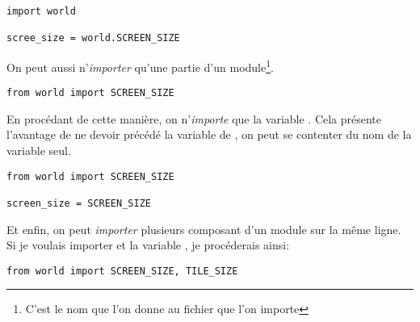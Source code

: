 \begin{lstlisting}
import world

scree_size = world.SCREEN_SIZE
\end{lstlisting}

On peut aussi n'\emph{importer} qu'une partie d'un module\footnote{C'est le nom que l'on donne au fichier que l'on importe}.

\begin{lstlisting}
from world import SCREEN_SIZE
\end{lstlisting}

En procédant de cette manière, on n'\emph{importe} que la variable .
Cela présente l'avantage de ne devoir précédé la variable  de , on peut se contenter du nom de la variable seul.

\begin{lstlisting}
from world import SCREEN_SIZE

screen_size = SCREEN_SIZE
\end{lstlisting}

Et enfin, on peut \emph{importer} plusieurs composant d'un module sur la même ligne.
Si je voulais importer  et la variable , je procéderais ainsi:

\begin{lstlisting}
from world import SCREEN_SIZE, TILE_SIZE
\end{lstlisting}
